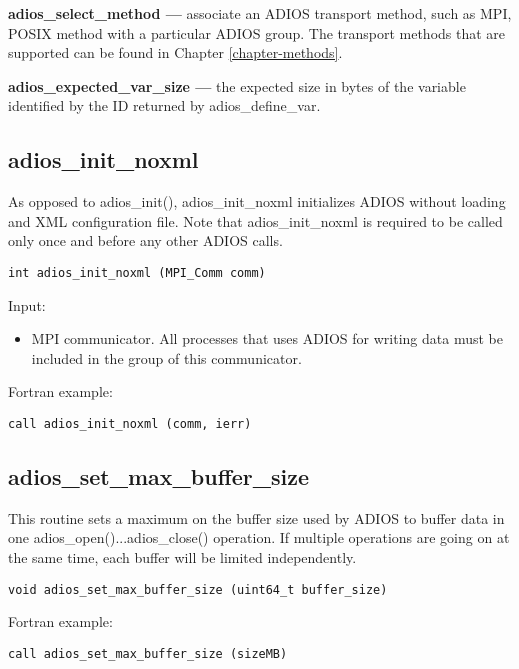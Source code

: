 \textbf{adios\_select\_method ---} associate an ADIOS transport method, such as MPI, 
POSIX method with a particular ADIOS group. The transport methods that are supported 
can be found in Chapter \ref{chapter-methods}.

\textbf{adios\_expected\_var\_size ---} the expected size in bytes of the variable identified by the ID returned by adios\_define\_var.


\subsection{adios\_init\_noxml}

As opposed to adios\_init(), adios\_init\_noxml initializes ADIOS without loading
and XML configuration file. Note that adios\_init\_noxml is required to be called only 
once and before any other ADIOS calls. 

\begin{lstlisting}[alsolanguage=C,caption={},label={}]
int adios_init_noxml (MPI_Comm comm)
\end{lstlisting}

Input: 
\begin{itemize}
\item MPI communicator. All processes that uses ADIOS for writing data must be included in the group of this communicator.
\end{itemize}

Fortran example: 
\begin{lstlisting}[alsolanguage=Fortran,caption={},label={}]
call adios_init_noxml (comm, ierr)
\end{lstlisting}

\subsection{adios\_set\_max\_buffer\_size}
\label{section-noxml-maxbuffersize}
This routine sets a maximum on the buffer size used by ADIOS to buffer data in one adios\_open()...adios\_close() operation.
If multiple operations are going on at the same time, each buffer will be limited independently.

\begin{lstlisting}[alsolanguage=C,caption={},label={}]
void adios_set_max_buffer_size (uint64_t buffer_size)
\end{lstlisting}

Fortran example:
\begin{lstlisting}[alsolanguage=Fortran,caption={},label={}]
call adios_set_max_buffer_size (sizeMB)
\end{lstlisting}


